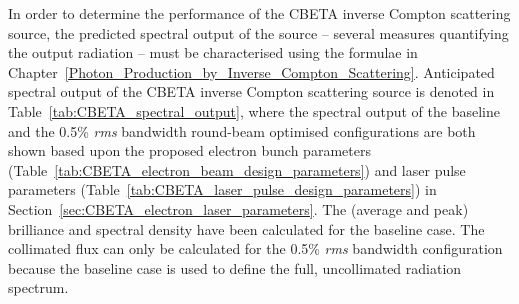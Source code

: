 \documentclass[../main.tex]{subfiles}
\begin{document}
In order to determine the performance of the CBETA inverse Compton scattering source, the predicted spectral output of the source -- several measures quantifying the output radiation -- must be characterised using the formulae in Chapter~\ref{Photon_Production_by_Inverse_Compton_Scattering}. Anticipated spectral output of the CBETA inverse Compton scattering source is denoted in Table~\ref{tab:CBETA_spectral_output}, where the spectral output of the baseline and the 0.5\% \textit{rms} bandwidth round-beam optimised configurations are both shown based upon the proposed electron bunch parameters (Table~\ref{tab:CBETA_electron_beam_design_parameters}) and laser pulse parameters (Table~\ref{tab:CBETA_laser_pulse_design_parameters}) in Section~\ref{sec:CBETA_electron_laser_parameters}. The (average and peak) brilliance and spectral density have been calculated for the baseline case. The collimated flux can only be calculated for the 0.5\% \textit{rms} bandwidth configuration because the baseline case is used to define the full, uncollimated radiation spectrum.
\end{document}
